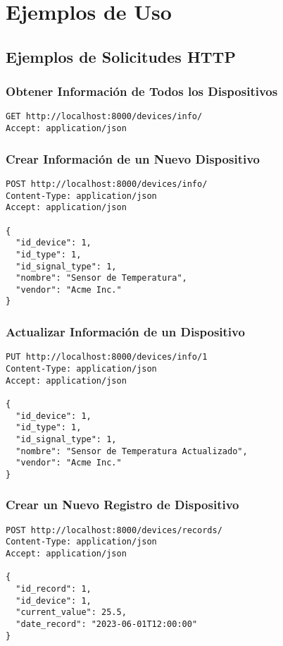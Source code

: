 \documentclass[12pt,letterpaper]{report}
\begin{document}
\chapter{Ejemplos de Uso}

\section{Ejemplos de Solicitudes HTTP}

\subsection{Obtener Información de Todos los Dispositivos}
\begin{lstlisting}
GET http://localhost:8000/devices/info/
Accept: application/json
\end{lstlisting}

\subsection{Crear Información de un Nuevo Dispositivo}
\begin{lstlisting}
POST http://localhost:8000/devices/info/
Content-Type: application/json
Accept: application/json

{
  "id_device": 1,
  "id_type": 1,
  "id_signal_type": 1,
  "nombre": "Sensor de Temperatura",
  "vendor": "Acme Inc."
}
\end{lstlisting}

\subsection{Actualizar Información de un Dispositivo}
\begin{lstlisting}
PUT http://localhost:8000/devices/info/1
Content-Type: application/json
Accept: application/json

{
  "id_device": 1,
  "id_type": 1,
  "id_signal_type": 1,
  "nombre": "Sensor de Temperatura Actualizado",
  "vendor": "Acme Inc."
}
\end{lstlisting}

\subsection{Crear un Nuevo Registro de Dispositivo}
\begin{lstlisting}
POST http://localhost:8000/devices/records/
Content-Type: application/json
Accept: application/json

{
  "id_record": 1,
  "id_device": 1,
  "current_value": 25.5,
  "date_record": "2023-06-01T12:00:00"
}
\end{lstlisting}
\end{document}
